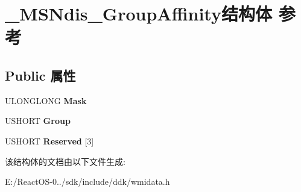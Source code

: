 \hypertarget{struct___m_s_ndis___group_affinity}{}\section{\+\_\+\+M\+S\+Ndis\+\_\+\+Group\+Affinity结构体 参考}
\label{struct___m_s_ndis___group_affinity}
\subsection*{Public 属性}
\begin{DoxyCompactItemize}
\item 
\mbox{\label{struct___m_s_ndis___group_affinity_a3595b6c1377b763b1ca76fc9eec2a1dc}} 
U\+L\+O\+N\+G\+L\+O\+NG {\bfseries Mask}
\item 
\mbox{\label{struct___m_s_ndis___group_affinity_abe6a60b38423c341c3557e5af2d17103}} 
U\+S\+H\+O\+RT {\bfseries Group}
\item 
\mbox{\label{struct___m_s_ndis___group_affinity_aaba477e4b538e7066712da551255453b}} 
U\+S\+H\+O\+RT {\bfseries Reserved} \mbox{[}3\mbox{]}
\end{DoxyCompactItemize}


该结构体的文档由以下文件生成\+:\begin{DoxyCompactItemize}
\item 
E\+:/\+React\+O\+S-\/0../sdk/include/ddk/wmidata.\+h\end{DoxyCompactItemize}
